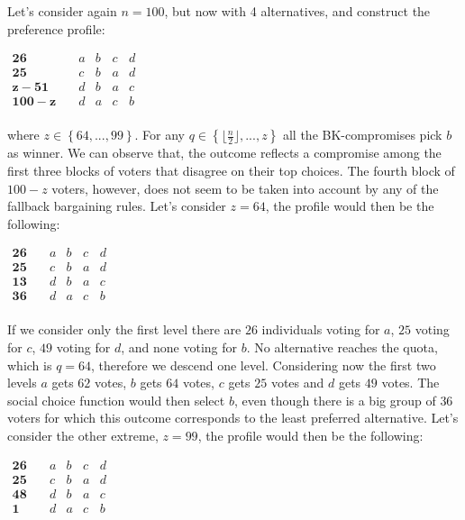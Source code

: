 \documentclass[version=3.21, pagesize, notitlepage, twoside=off, bibliography=totoc, DIV=calc, fontsize=12pt, a4paper]{scrartcl}
\begin{document}
\begin{example}
	\label{ex:exk}
	Let's consider again $n=100$, but now with 4 alternatives, and construct the preference profile:
	\begin{center}
		$
		\begin{array}{ccccc}
		\mathbf{26} \quad &a&b&c&d\\
		\mathbf{25} \quad &c&b&a&d\\
		\mathbf{z-51} \quad &d&b&a&c\\
		\mathbf{100-z} \quad &d&a&c&b\\
		\end{array}
		$
	\end{center}


where $z\in \left\{ 64,..., 99\right\}$. For any $q\in \left\{ \lfloor \frac{n}{2}\rfloor,..., z\right\}$ all the BK-compromises pick $b$ as winner. We can observe that, the outcome reflects a compromise among the first three blocks of voters that disagree on their top choices. The fourth block of $100-z$ voters, however, does not seem to be taken into account by any of the fallback bargaining rules. 
Let's consider $z=64$, the profile would then be the following: 

\begin{center}
	$
	\begin{array}{ccccc}
	\mathbf{26} \quad &a&b&c&d\\
	\mathbf{25} \quad &c&b&a&d\\
	\mathbf{13} \quad &d&b&a&c\\
	\mathbf{36} \quad &d&a&c&b\\
	\end{array}
	$
\end{center}

If we consider only the first level there are $26$ individuals voting for $a$, $25$ voting for $c$, $49$ voting for $d$, and none voting for $b$. No alternative reaches the quota, which is $q=64$, therefore we descend one level. Considering now the first two levels $a$ gets $62$ votes, $b$ gets $64$ votes, $c$ gets $25$ votes and $d$ gets $49$ votes. The social choice function would then select $b$, even though there is a big group of $36$ voters for which this outcome corresponds to the least preferred alternative.
Let's consider the other extreme, $z=99$, the profile would then be the following: 

\begin{center}
	$
	\begin{array}{ccccc}
	\mathbf{26} \quad &a&b&c&d\\
	\mathbf{25} \quad &c&b&a&d\\
	\mathbf{48} \quad &d&b&a&c\\
	\mathbf{1} \quad &d&a&c&b\\
	\end{array}
	$
\end{center} 


\end{example}
\end{document}
